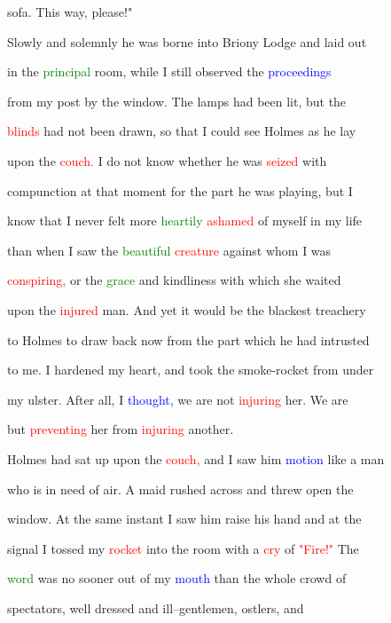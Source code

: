  sofa. This way, please!"



 Slowly and solemnly he was borne into Briony Lodge and laid out

 in the \textcolor{green}{principal} room, while I still observed the \textcolor{blue}{proceedings}

 from my post by the window. The lamps had been lit, but the

 \textcolor{red}{blinds} had not been drawn, so that I could see Holmes as he lay

 upon the \textcolor{red}{couch.} I do not know whether he was \textcolor{red}{seized} with

 compunction at that moment for the part he was playing, but I

 know that I never felt more \textcolor{green}{heartily} \textcolor{red}{ashamed} of myself in my life

 than when I saw the \textcolor{green}{beautiful} \textcolor{red}{creature} against whom I was

 \textcolor{red}{conspiring,} or the \textcolor{green}{grace} and kindliness with which she \textcolor{BurntOrange}{waited}

 upon the \textcolor{red}{injured} man. And yet it would be the blackest \textcolor{BurntOrange}{treachery}

 to Holmes to draw back now from the part which he had intrusted

 to me. I hardened my heart, and took the smoke-rocket from under

 my ulster. After all, I \textcolor{blue}{thought,} we are not \textcolor{red}{injuring} her. We are

 but \textcolor{red}{preventing} her from \textcolor{red}{injuring} another.



 Holmes had sat up upon the \textcolor{red}{couch,} and I saw him \textcolor{blue}{motion} like a man

 who is in need of air. A maid rushed across and threw open the

 window. At the same instant I saw him raise his hand and at the

 signal I tossed my \textcolor{red}{rocket} into the room with a \textcolor{red}{cry} of \textcolor{red}{"Fire!"} The

 \textcolor{green}{word} was no sooner out of my \textcolor{blue}{mouth} than the whole crowd of

 spectators, well dressed and ill--gentlemen, ostlers, and

